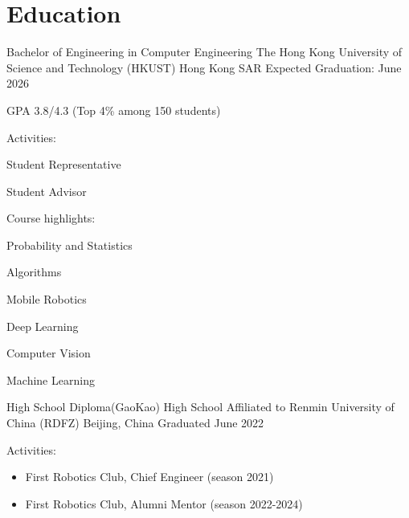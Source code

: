 \vspace{-\acvSectionTopSkip}
\section{Education}
\cventry
{Bachelor of Engineering in Computer Engineering} %
{The Hong Kong University of Science and Technology (HKUST)} %
{Hong Kong SAR} %
{Expected Graduation: June 2026} %
\begin{cvitems}
    \item {GPA 3.8/4.3 (Top 4\% among 150 students)}
    \item {Activities:}
        \begin{itemize}
            \begin{multicols}{2}
                \item Student Representative
                \item Student Advisor
            \end{multicols}
        \end{itemize}
    \item {Course highlights:}
        \begin{itemize}
            \begin{multicols}{2}
                \item Probability and Statistics
                \item Algorithms
                \item Mobile Robotics
                \item Deep Learning
                \item Computer Vision
                \item Machine Learning
            \end{multicols}
        \end{itemize}
\end{cvitems}

\cventry
{High School Diploma(GaoKao)} %
{High School Affiliated to Renmin University of China (RDFZ)} %
{Beijing, China} %
{Graduated June 2022} %
\begin{cvitems}
\item {Activities:}
\begin{itemize}
    \item First Robotics Club, Chief Engineer (season 2021)
    \item First Robotics Club, Alumni Mentor (season 2022-2024)
\end{itemize}
\end{cvitems}
